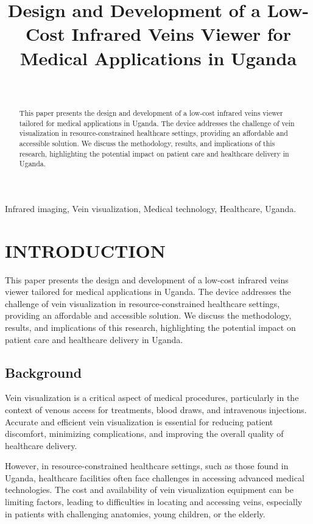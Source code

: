 \documentclass{IEEEtran}
\title{Design and Development of a Low-Cost Infrared Veins Viewer for Medical Applications in Uganda}
\author{\IEEEauthorblockN{1\textsuperscript{st} Shawal Mbalire}\\
\IEEEauthorblockA{\textit{Department of Electrical and Computer Engineering} \\
\textit{Makerere University}\\
Kampala, Uganda \\
shawal.mbalire@ieee.org or 0009-0002-5468-9395}
}
\begin{document}
    \maketitle

    \begin{abstract}
    This paper presents the design and development of a low-cost infrared veins viewer tailored for medical applications in Uganda. The device addresses the challenge of vein visualization in resource-constrained healthcare settings, providing an affordable and accessible solution. We discuss the methodology, results, and implications of this research, highlighting the potential impact on patient care and healthcare delivery in Uganda.
    \end{abstract}

    \begin{IEEEkeywords}
    Infrared imaging, Vein visualization, Medical technology, Healthcare, Uganda.
    \end{IEEEkeywords}

    \section{INTRODUCTION}\label{sec:introduction}
    This paper presents the design and development of a low-cost infrared veins viewer tailored for medical applications in Uganda. The device addresses the challenge of vein visualization in resource-constrained healthcare settings, providing an affordable and accessible solution. We discuss the methodology, results, and implications of this research, highlighting the potential impact on patient care and healthcare delivery in Uganda.

    \subsection{Background}\label{background}
    Vein visualization is a critical aspect of medical procedures, particularly in the context of venous access for treatments, blood draws, and intravenous injections. Accurate and efficient vein visualization is essential for reducing patient discomfort, minimizing complications, and improving the overall quality of healthcare delivery.

    However, in resource-constrained healthcare settings, such as those found in Uganda, healthcare facilities often face challenges in accessing advanced medical technologies. The cost and availability of vein visualization equipment can be limiting factors, leading to difficulties in locating and accessing veins, especially in patients with challenging anatomies, young children, or the elderly.
\end{document}
